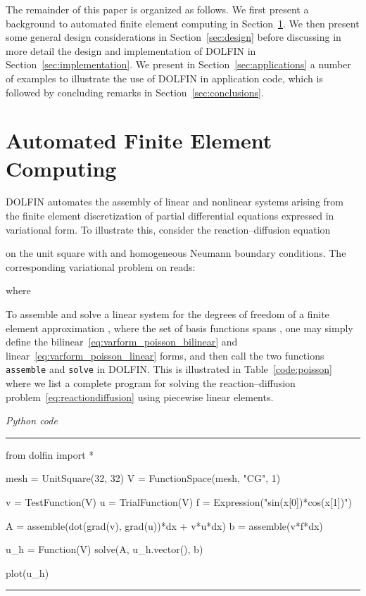 \documentclass[acmtoms]{acmtrans2m}
\newenvironment{pythoncode}[1]{\center\minipage{#1\textwidth}\footnotesize\hfill\it Python code \rm\vspace{0.1cm}\hrule\renewcommand{\baselinestretch}{0.9}\footnotesize\verbatim}{\endverbatim\hrule\normalsize\endminipage\newline\endcenter}
\newcommand{\emp}[1]{\texttt{#1}}
\newcommand{\dolfin}{DOLFIN}
\begin{document}
The remainder of this paper is organized as follows. We first present
a background to automated finite element computing in
Section~\ref{sec:automation}. We then present some general design
considerations in Section~\ref{sec:design} before discussing in more detail
the
design and implementation of \dolfin{} in
Section~\ref{sec:implementation}. We present in
Section~\ref{sec:applications} a number of examples to illustrate the
use of \dolfin{} in application code, which is followed by concluding
remarks in Section~\ref{sec:conclusions}.

\section{Automated Finite Element Computing}
\label{sec:automation}

\dolfin{} automates the assembly of linear and nonlinear systems
arising from the finite element discretization of partial differential
equations expressed in variational form. To illustrate this, consider
the reaction--diffusion equation

on the unit square  with  and homogeneous Neumann boundary conditions. The
corresponding variational problem on  reads:

where

To assemble and solve a linear system  for the degrees of
freedom  of a finite element approximation , where the set of basis
functions  spans , one
may simply define the bilinear~\eqref{eq:varform_poisson_bilinear} and
linear~\eqref{eq:varform_poisson_linear} forms, and then call the two
functions \emp{assemble} and \emp{solve} in \dolfin{}. This is illustrated in
Table~\ref{code:poisson} where we list a complete program for solving
the reaction--diffusion problem~\eqref{eq:reactiondiffusion} using
piecewise linear elements.

\begin{table}
\begin{pythoncode}{0.9}
from dolfin import *

mesh = UnitSquare(32, 32)
V = FunctionSpace(mesh, "CG", 1)

v = TestFunction(V)
u = TrialFunction(V)
f = Expression("sin(x[0])*cos(x[1])")

A = assemble(dot(grad(v), grad(u))*dx + v*u*dx)
b = assemble(v*f*dx)

u_h = Function(V)
solve(A, u_h.vector(), b)

plot(u_h)
\end{pythoncode}
\caption{A complete program for solving the reaction--diffusion
  problem~\eqref{eq:reactiondiffusion} and plotting the solution. This
  and other presented code examples are written for \dolfin{} version
  0.9.5 (released in December 2009).}
\label{code:poisson}
\end{table}
\end{document}
